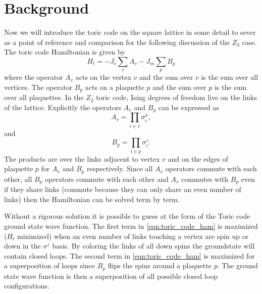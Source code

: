 \documentclass[aps,floatfix,11pt,twocolumn]{revtex4-1}
\begin{document}
\section{Background}

    Now we will introduce the toric code on the square lattice in some detail to sever as a point of reference and
    comparison for the following discussion of the $Z_3$ case. The toric code Hamiltonian is given by
    \begin{equation}
        H_t = -J_e\sum_v A_v - J_m\sum_p B_p
        \label{eqn:toric_code_ham}
    \end{equation}
    where the operator $A_v$ acts on the vertex $v$ and the sum over $v$ is the sum over all vertices. 
    The operator $B_p$ acts on a plaquette $p$ and the sum over $p$ is the sum over all
    plaquettes. In the $Z_2$ toric code, Ising degrees of freedom live on the links of the
    lattice. Explicitly the operators $A_v$ and $B_p$ can be expressed as
    \begin{equation}
        A_v = \prod_{i\in v} \sigma^x_i
        ,
    \end{equation}
    and
    \begin{equation}
        B_p = \prod_{i\in p} \sigma^z_i
        .
    \end{equation}
    The products are over the links adjacent to vertex $v$ and on the edges of plaquette $p$ for
    $A_v$ and $B_p$ respectively. Since all $A_v$ operators commute with each other, all
    $B_p$ operators commute with each other and $A_v$ commutes with $B_p$ even if they share
    links (commute because they
    can only share an even number of links) then the Hamiltonian can be solved term by term.

    Without a rigorous solution it is possible to guess at the form of the Toric code
    ground state wave function. The first term in \ref{eqn:toric_code_ham} is maximized ($H_t$
    minimized) when an even number of links touching a vertex are spin up or down in the
    $\sigma^z$ basis. By coloring the links of all down spins the groundstate will
    contain closed loops. The second term in \ref{eqn:toric_code_ham} is maximized for a
    superposition of loops since $B_p$ flips the spins around a plaquette $p$. The ground state
    wave function is then a superposition of all possible closed loop configurations. 
    
\end{document}
